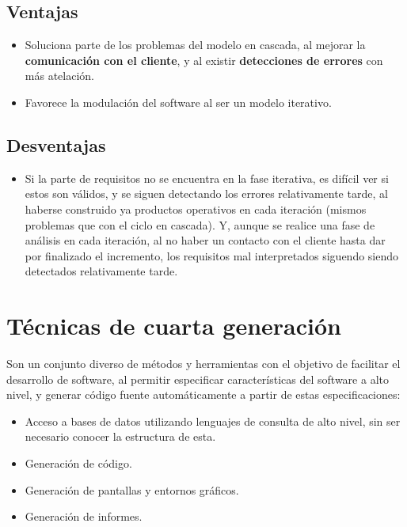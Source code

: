 \subsection{Ventajas}

\begin{itemize}
   \item Soluciona parte de los problemas del modelo en cascada, al mejorar la \textbf{comunicación con el cliente}, y al existir \textbf{detecciones de errores} con más atelación.
   \item Favorece la modulación del software al ser un modelo iterativo.
\end{itemize}

\subsection{Desventajas}

\begin{itemize}
   \item Si la parte de requisitos no se encuentra en la fase iterativa, es difícil ver si estos son válidos, y se siguen detectando los errores relativamente tarde, al haberse construido ya productos operativos en cada iteración (mismos problemas que con el ciclo en cascada). Y, aunque se realice una fase de análisis en cada iteración, al no haber un contacto con el cliente hasta dar por finalizado el incremento, los requisitos mal interpretados siguendo siendo detectados relativamente tarde.
\end{itemize}


\section{Técnicas de cuarta generación}

Son un conjunto diverso de métodos y herramientas con el objetivo de facilitar el desarrollo de software, al permitir especificar características del software a alto nivel, y generar código fuente automáticamente a partir de estas especificaciones:

\begin{itemize}
   \item Acceso a bases de datos utilizando lenguajes de consulta de alto nivel, sin ser necesario conocer la estructura de esta.
   \item Generación de código.
   \item Generación de pantallas y entornos gráficos.
   \item Generación de informes.
\end{itemize}

